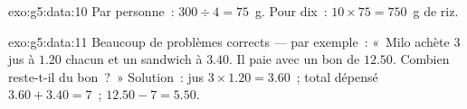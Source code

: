 \begin{solution}{exo:g5:data:10}
Par personne~: $300 \div 4 = 75$~g. Pour dix~:
$10 \times 75 = 750$~g de riz.
\end{solution}

\begin{solution}{exo:g5:data:11}
Beaucoup de problèmes corrects --- par exemple~: «~Milo achète
$3$ jus à $1.20$ chacun et un sandwich à $3.40$. Il paie avec un
bon de $12.50$. Combien reste-t-il du bon~?~» Solution~: jus
$3 \times 1.20 = 3.60$~; total dépensé $3.60 + 3.40 = 7$~; 
$12.50 - 7 = 5.50$.
\end{solution}
